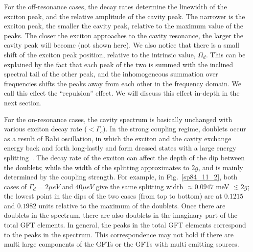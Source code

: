 For the off-resonance cases, the decay rates determine the linewidth of the exciton peak, and the relative amplitude of the cavity peak. The narrower is the exciton peak, the smaller the cavity peak, relative to the maximum value of the peaks. The closer the exciton approaches to the cavity resonance, the larger the cavity peak will become (not shown here). We also notice that there is a small shift of the exciton peak position, relative to the intrinsic value, $\Omega_d$. This can be explained by the fact that each peak of the two is summed with the inclined spectral tail of the other peak, and the inhomogeneous summation over frequencies shifts the peaks away from each other in the frequency domain. We call this effect the ``repulsion'' effect. We will discuss this effect in-depth in the next section.

For the on-resonance cases, the cavity spectrum is basically unchanged with various exciton decay rate ($<\Gamma_c$). In the strong coupling regime, doublets occur as a result of Rabi oscillation, in which the exciton and the cavity exchange energy back and forth long-lastly and form dressed states with a large energy splitting~\cite{Scully1997,Qi2011d}. The decay rate of the exciton can affect the depth of the dip between the doublets; while the width of the splitting approximates to $2g$, and is mainly determined by the coupling strength. For example, in Fig.~\ref{sp84_11_2}, both cases of $\Gamma_d=2\mu eV$ and $40\mu eV$ give the same splitting width $\approx 0.0947$ meV $\lesssim 2g$; the lowest point in the dips of the two cases (from top to bottom) are at $0.1215$ and $0.1982$ units relative to the maximum of the doublets. Once there are doublets in the spectrum, there are also doublets in the imaginary part of the total GFT elements. In general, the peaks in the total GFT elements correspond to the peaks in the spectrum. This correspondence may not hold if there are multi large components of the GFTs or the GFTs with multi emitting sources.


